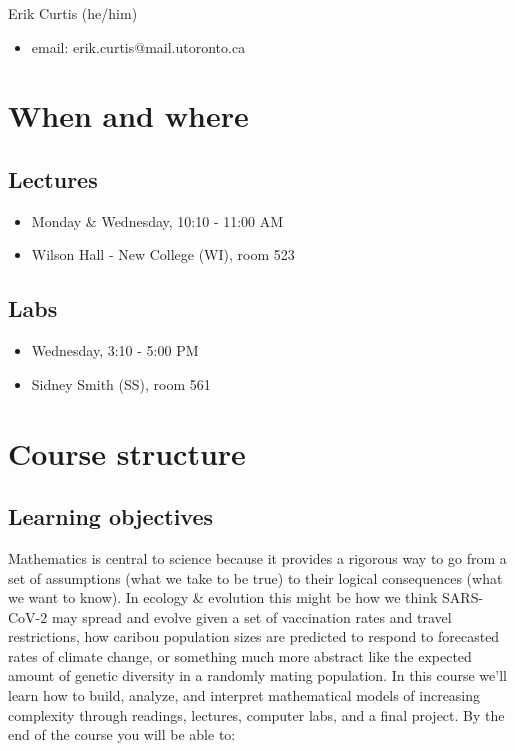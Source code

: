 \documentclass[
]{article}
\providecommand{\tightlist}{%
  \setlength{\itemsep}{0pt}\setlength{\parskip}{0pt}}
\begin{document}
Erik Curtis (he/him)

\begin{itemize}
\tightlist
\item
  email: erik.curtis@mail.utoronto.ca
\end{itemize}

\section{When and where}\label{when-and-where}

\subsection{Lectures}\label{lectures}

\begin{itemize}
\tightlist
\item
  Monday \& Wednesday, 10:10 - 11:00 AM
\item
  Wilson Hall - New College (WI), room 523
\end{itemize}

\subsection{Labs}\label{labs}

\begin{itemize}
\tightlist
\item
  Wednesday, 3:10 - 5:00 PM
\item
  Sidney Smith (SS), room 561
\end{itemize}

\section{Course structure}\label{course-structure}

\subsection{Learning objectives}\label{learning-objectives}

Mathematics is central to science because it provides a rigorous way to
go from a set of assumptions (what we take to be true) to their logical
consequences (what we want to know). In ecology \& evolution this might
be how we think SARS-CoV-2 may spread and evolve given a set of
vaccination rates and travel restrictions, how caribou population sizes
are predicted to respond to forecasted rates of climate change, or
something much more abstract like the expected amount of genetic
diversity in a randomly mating population. In this course we'll learn
how to build, analyze, and interpret mathematical models of increasing
complexity through readings, lectures, computer labs, and a final
project. By the end of the course you will be able to:
\end{document}
